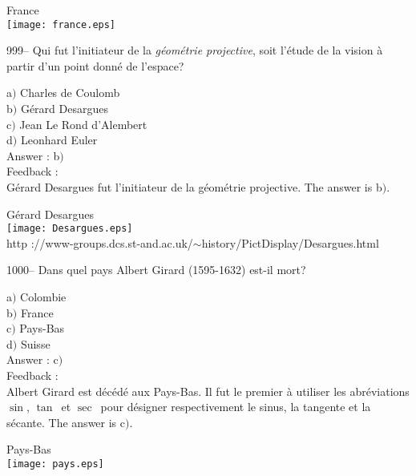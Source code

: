 \documentclass[letterpaper, 12pt]{article}
\begin{document}
        \begin{center}
        France\\
    \texttt{[image: france.eps]}\\
    \end{center}

999-- Qui fut l'initiateur de la {\sl g\'eom\'etrie projective},
soit l'\'etude de la vision \`a partir d'un point donn\'e de
l'espace?

a$)$ Charles de Coulomb \\
b$)$ G\'erard Desargues\\
c$)$ Jean Le Rond d'Alembert \\
d$)$ Leonhard Euler\\

Answer : b$)$\\

Feedback : \\
G\'erard Desargues fut l'initiateur de la g\'eom\'etrie projective.
The answer is b$)$.\\



    \begin{center}
        G\'erard Desargues\\
    \texttt{[image: Desargues.eps]}\\
        {\footnotesize http
://www-groups.dcs.st-and.ac.uk/$\sim$history/PictDisplay/Desargues.html}
    \end{center}

1000-- Dans quel pays Albert Girard (1595-1632) est-il mort?

a$)$ Colombie \\
b$)$ France \\
c$)$ Pays-Bas \\
d$)$ Suisse\\

Answer : c$)$\\

Feedback : \\
Albert Girard est d\'ec\'ed\'e aux Pays-Bas. Il fut le premier \`a
utiliser les abr\'eviations \og $\sin$\fg, \og $\tan$\fg\ et \og
$\sec$\fg\ pour d\'esigner respectivement le sinus, la tangente et
la s\'ecante.
The answer is c$)$.\\

        \begin{center}
        Pays-Bas\\
    \texttt{[image: pays.eps]}\\
    \end{center}
\end{document}

